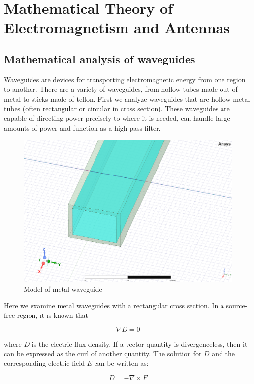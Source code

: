 \documentclass[a4paper,12pt]{report}
\begin{document}

\chapter{Mathematical Theory of Electromagnetism and Antennas }

\section{Mathematical analysis of waveguides}

Waveguides are devices for transporting electromagnetic energy
from one region to another.
There are a variety of waveguides, from hollow tubes made out of metal to
sticks made of teflon.
First we analyze waveguides that are hollow metal tubes
(often rectangular or circular in cross section).
These waveguides are capable of directing power precisely to where it is needed,
can handle large amounts of power and function as a high-pass filter.

\begin{figure}
  \begin{center}
    \includegraphics[clip, keepaspectratio, width=0.5\linewidth]{img/metal_waveguide.png}
    \caption{Model of metal waveguide}
    \label{fig:metal_waveguide}
  \end{center}
\end{figure}

Here we examine metal waveguides with a rectangular cross section.
In a source-free region, it is known that

\begin{equation}
  \nabla D = 0
\end{equation}

where $D$ is the electric flux density.
If a vector quantity is divergenceless,
then it can be expressed as the curl of another quantity.
The solution for $D$ and the corresponding electric field $E$
can be written as:

\begin{equation}
  D = -\nabla \times F
\end{equation}
\end{document}
